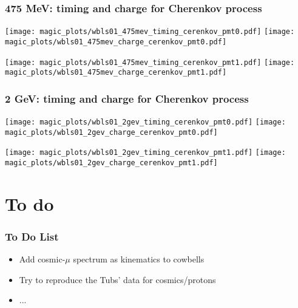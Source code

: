 \documentclass[xcolor=dvipsnames]{beamer}
\begin{document}
\begin{frame}[fragile]
  \frametitle{475 MeV: timing and charge for Cherenkov process}

\texttt{[image: magic\_plots/wbls01\_475mev\_timing\_cerenkov\_pmt0.pdf]}%
\texttt{[image: magic\_plots/wbls01\_475mev\_charge\_cerenkov\_pmt0.pdf]}%

\texttt{[image: magic\_plots/wbls01\_475mev\_timing\_cerenkov\_pmt1.pdf]}%
\texttt{[image: magic\_plots/wbls01\_475mev\_charge\_cerenkov\_pmt1.pdf]}%

\end{frame}
\begin{frame}[fragile]
  \frametitle{2 GeV: timing and charge for Cherenkov process}

\texttt{[image: magic\_plots/wbls01\_2gev\_timing\_cerenkov\_pmt0.pdf]}%
\texttt{[image: magic\_plots/wbls01\_2gev\_charge\_cerenkov\_pmt0.pdf]}%

\texttt{[image: magic\_plots/wbls01\_2gev\_timing\_cerenkov\_pmt1.pdf]}%
\texttt{[image: magic\_plots/wbls01\_2gev\_charge\_cerenkov\_pmt1.pdf]}%

\end{frame}


\section{To do}

\begin{frame}
  \frametitle{To Do List}
  \begin{itemize}
  \item Add cosmic-$\mu$ spectrum as kinematics to cowbells
  \item Try to reproduce the Tubs' data for cosmics/protons
  \item ...
  \end{itemize}
\end{frame}
\end{document}

